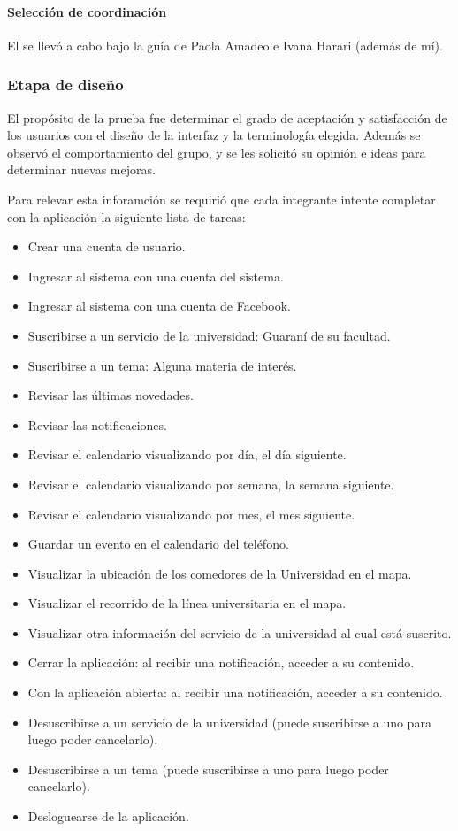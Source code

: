 \paragraph{Selección de coordinación}
\label{desarrollo_pruebas_usabilidad_preparativos_coordinacion}

El  se llevó a cabo bajo la guía de Paola Amadeo e Ivana Harari (además de mí).

\subsubsection{Etapa de diseño}
\label{desarrollo_pruebas_usabilidad_diseno}

El propósito de la prueba fue determinar el grado de aceptación y satisfacción de los usuarios con el diseño de la interfaz y la terminología elegida. Además se observó el comportamiento del grupo, y se les solicitó su opinión e ideas para determinar nuevas mejoras. 

Para relevar esta inforamción se requirió que cada integrante intente completar con la aplicación la siguiente lista de tareas: 
\begin{itemize}
\item Crear una cuenta de usuario.
\item Ingresar al sistema con una cuenta del sistema.
\item Ingresar al sistema con una cuenta de Facebook.
\item Suscribirse a un servicio de la universidad: Guaraní de su facultad.
\item Suscribirse a un tema: Alguna materia de interés.
\item Revisar las últimas novedades.
\item Revisar las notificaciones.
\item Revisar el calendario visualizando por día, el día siguiente.
\item Revisar el calendario visualizando por semana, la semana siguiente.
\item Revisar el calendario visualizando por mes, el mes siguiente.
\item Guardar un evento en el calendario del teléfono.
\item Visualizar la ubicación de los comedores de la Universidad en el mapa.
\item Visualizar el recorrido de la línea universitaria en el mapa.
\item Visualizar otra información del servicio de la universidad al cual está suscrito.
\item Cerrar la aplicación: al recibir una notificación, acceder a su contenido.
\item Con la aplicación abierta: al recibir una notificación, acceder a su contenido.
\item Desuscribirse a un servicio de la universidad (puede suscribirse a uno para luego poder cancelarlo).
\item Desuscribirse a un tema (puede suscribirse a uno para luego poder cancelarlo).
\item Desloguearse de la aplicación.
\end{itemize}

